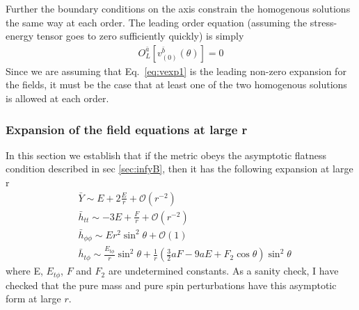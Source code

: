 \documentclass[aps,prd,amsmath,showpacs,amssymb,superscriptaddress,nofootinbib,longbibliography,eqsecnum,preprintnumbers]{revtex4-1}
\newcommand{\zach}[1]{\textcolor{ForestGreen}{#1}}
\begin{document}
Further the boundary conditions on the axis constrain the homogenous solutions the same way at each order. The leading order equation (assuming the stress-energy tensor goes to zero sufficiently quickly) is simply
\begin{align}
O_L^{\bar a}[v_{(0)}^{\bar b}(\theta)]=0
\end{align}
Since we are assuming that Eq.~\eqref{eq:vexp1} is the leading non-zero expansion for the fields, it must be the case that at least one of the two homogenous solutions is allowed at each order.


\subsubsection{Expansion of the field equations at large r}
\label{sec:larger}

In this section we establish that if the metric obeys the asymptotic flatness condition described in sec \ref{sec:infyB}, then it has the following expansion at large r
\begin{align}
&\bar Y \sim E+2\frac{E}{r}+\mathcal{O}(r^{-2}) \nonumber \\
&\bar h_{tt} \sim -3E +\frac{F}{r}+\mathcal{O}(r^{-2}) \nonumber \\
&\bar h_{\phi\phi}\sim Er^2\sin^2\theta  +\mathcal{O}(1) \nonumber \\
&\bar h_{t\phi}\sim \frac{E_{t\phi}}{r}\sin^2\theta+ \frac{1}{r}\left( \frac{3}{2}aF-9aE+F_2 \cos\theta \right)\sin^2\theta\end{align}
where E, $E_{t\phi}$, $F$ and $F_2$ are undetermined constants. As a sanity check, I have checked that the pure mass and pure spin perturbations have this asymptotic form at large $r$.
\end{document}
